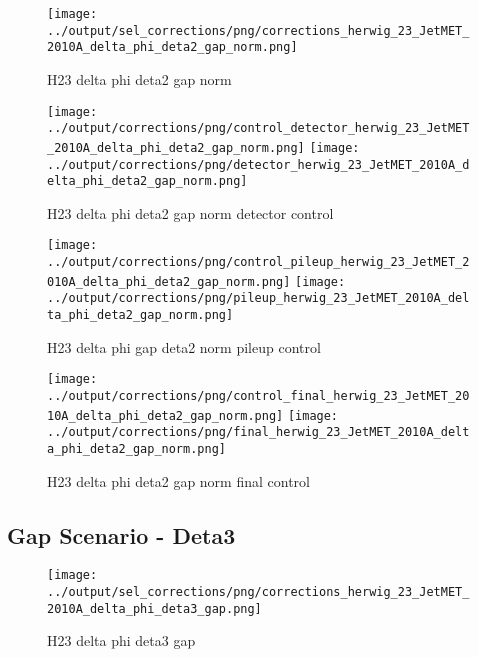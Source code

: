 \documentclass[11pt]{book}
\begin{document}
\begin{figure}[ht]
\centering
\texttt{[image: ../output/sel\_corrections/png/corrections\_herwig\_23\_JetMET\_2010A\_delta\_phi\_deta2\_gap\_norm.png]}
\caption{H23 delta phi deta2 gap norm}
\label{fig:H23_JetMET_2010A_delta_phi_deta2_gap_norm}
\end{figure}


\begin{figure}[ht]
\centering
\texttt{[image: ../output/corrections/png/control\_detector\_herwig\_23\_JetMET\_2010A\_delta\_phi\_deta2\_gap\_norm.png]}
\texttt{[image: ../output/corrections/png/detector\_herwig\_23\_JetMET\_2010A\_delta\_phi\_deta2\_gap\_norm.png]}
\caption{H23 delta phi deta2 gap norm detector control}
\label{fig:H23_JetMET_2010A_delta_phi_deta2_gap_norm_detector_control}
\end{figure}

\begin{figure}[ht]
\centering
\texttt{[image: ../output/corrections/png/control\_pileup\_herwig\_23\_JetMET\_2010A\_delta\_phi\_deta2\_gap\_norm.png]}
\texttt{[image: ../output/corrections/png/pileup\_herwig\_23\_JetMET\_2010A\_delta\_phi\_deta2\_gap\_norm.png]}
\caption{H23 delta phi gap deta2 norm pileup control}
\label{fig:H23_JetMET_2010A_delta_phi_deta2_gap_norm_pileup_control}
\end{figure}


\begin{figure}[ht]
\centering
\texttt{[image: ../output/corrections/png/control\_final\_herwig\_23\_JetMET\_2010A\_delta\_phi\_deta2\_gap\_norm.png]}
\texttt{[image: ../output/corrections/png/final\_herwig\_23\_JetMET\_2010A\_delta\_phi\_deta2\_gap\_norm.png]}
\caption{H23 delta phi deta2 gap norm final control}
\label{fig:H23_JetMET_2010A_delta_phi_deta2_gap_norm_final_control}
\end{figure}


\clearpage
\subsection{Gap Scenario - Deta3}

\begin{figure}[ht]
\centering
\texttt{[image: ../output/sel\_corrections/png/corrections\_herwig\_23\_JetMET\_2010A\_delta\_phi\_deta3\_gap.png]}
\caption{H23 delta phi deta3 gap}
\label{fig:H23_JetMET_2010A_delta_phi_deta3_gap}
\end{figure}
\end{document}
